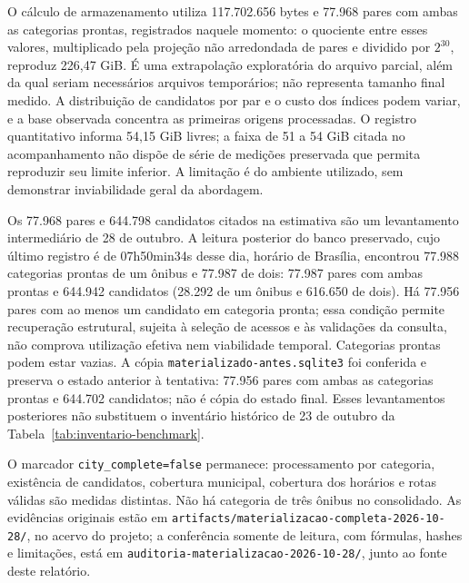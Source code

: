 O cálculo de armazenamento utiliza 117.702.656 bytes e 77.968 pares com ambas as categorias prontas, registrados naquele momento: o quociente entre esses valores, multiplicado pela projeção não arredondada de pares e dividido por $2^{30}$, reproduz 226,47 GiB. É uma extrapolação exploratória do arquivo parcial, além da qual seriam necessários arquivos temporários; não representa tamanho final medido. A distribuição de candidatos por par e o custo dos índices podem variar, e a base observada concentra as primeiras origens processadas. O registro quantitativo informa 54,15 GiB livres; a faixa de 51 a 54 GiB citada no acompanhamento não dispõe de série de medições preservada que permita reproduzir seu limite inferior. A limitação é do ambiente utilizado, sem demonstrar inviabilidade geral da abordagem.

Os 77.968 pares e 644.798 candidatos citados na estimativa são um levantamento intermediário de 28 de outubro. A leitura posterior do banco preservado, cujo último registro é de 07h50min34s desse dia, horário de Brasília, encontrou 77.988 categorias prontas de um ônibus e 77.987 de dois: 77.987 pares com ambas prontas e 644.942 candidatos (28.292 de um ônibus e 616.650 de dois). Há 77.956 pares com ao menos um candidato em categoria pronta; essa condição permite recuperação estrutural, sujeita à seleção de acessos e às validações da consulta, não comprova utilização efetiva nem viabilidade temporal. Categorias prontas podem estar vazias. A cópia \nolinkurl{materializado-antes.sqlite3} foi conferida e preserva o estado anterior à tentativa: 77.956 pares com ambas as categorias prontas e 644.702 candidatos; não é cópia do estado final. Esses levantamentos posteriores não substituem o inventário histórico de 23 de outubro da Tabela~\ref{tab:inventario-benchmark}.

O marcador \texttt{city\_complete=false} permanece: processamento por categoria, existência de candidatos, cobertura municipal, cobertura dos horários e rotas válidas são medidas distintas. Não há categoria de três ônibus no consolidado. As evidências originais estão em \nolinkurl{artifacts/materializacao-completa-2026-10-28/}, no acervo do projeto; a conferência somente de leitura, com fórmulas, hashes e limitações, está em \nolinkurl{auditoria-materializacao-2026-10-28/}, junto ao fonte deste relatório.


